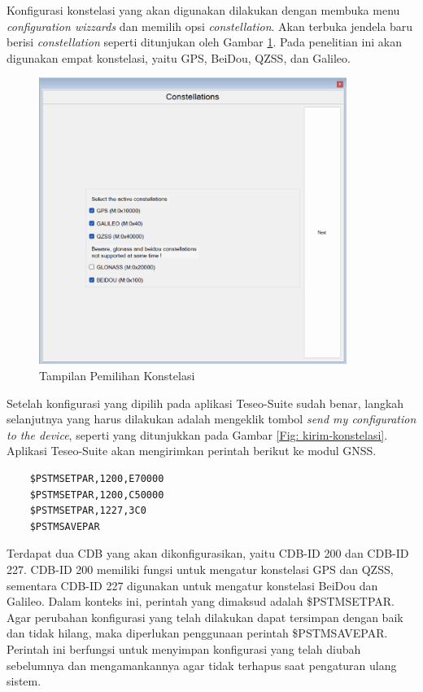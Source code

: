 Konfigurasi konstelasi yang akan digunakan dilakukan dengan membuka menu \textit{configuration wizzards} dan memilih opsi \textit{constellation}. Akan terbuka jendela baru berisi \textit{constellation} seperti ditunjukan oleh Gambar \ref{Fig: pilih-konstelasi}. Pada penelitian ini akan digunakan empat konstelasi, yaitu GPS, BeiDou, QZSS, dan Galileo.

\begin{figure}[H]
	\centering
	\includegraphics[width=10cm]{contents/chapter-3/setting-konstelasi/pilih-konfigurasi.png}
	\caption{Tampilan Pemilihan Konstelasi}
	\label{Fig: pilih-konstelasi}
\end{figure}


Setelah konfigurasi yang dipilih pada aplikasi Teseo-Suite sudah benar, langkah selanjutnya yang harus dilakukan adalah mengeklik tombol \textit{send my configuration to the device}, seperti yang ditunjukkan pada Gambar \ref{Fig: kirim-konstelasi}. Aplikasi Teseo-Suite akan mengirimkan perintah berikut ke modul GNSS.

\begin{verbatim}
	$PSTMSETPAR,1200,E70000
	$PSTMSETPAR,1200,C50000
	$PSTMSETPAR,1227,3C0
	$PSTMSAVEPAR
\end{verbatim}

Terdapat dua CDB yang akan dikonfigurasikan, yaitu CDB-ID 200 dan CDB-ID 227. CDB-ID 200 memiliki fungsi untuk mengatur konstelasi GPS dan QZSS, sementara CDB-ID 227 digunakan untuk mengatur konstelasi BeiDou dan Galileo. Dalam konteks ini, perintah yang dimaksud adalah \$PSTMSETPAR. Agar perubahan konfigurasi yang telah dilakukan dapat tersimpan dengan baik dan tidak hilang, maka diperlukan penggunaan perintah \$PSTMSAVEPAR. Perintah ini berfungsi untuk menyimpan konfigurasi yang telah diubah sebelumnya dan mengamankannya agar tidak terhapus saat pengaturan ulang sistem. 

